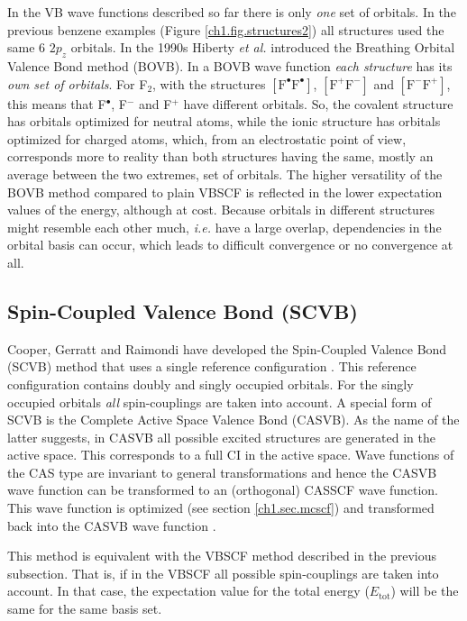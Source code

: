 In the VB wave functions described so far there is only \textit{one} set of orbitals. In the previous benzene examples (Figure \ref{ch1.fig.structures2}) all structures used the same 6 $2p_z$ orbitals. In the 1990s Hiberty \textit{et al.} introduced the Breathing Orbital Valence Bond method (BOVB). In a BOVB wave function \textit{each structure} has its \textit{own set of orbitals}. For F$_2$, with the structures $\mathrm{[F^\bullet F^\bullet]}$, $\mathrm{[F^{+} F^{-}]}$ and $\mathrm{[F^{-} F^{+}]}$, this means that F$^\bullet$, F$^{-}$ and F$^{+}$ have different orbitals. So, the covalent structure has orbitals optimized for neutral atoms, while the ionic structure has orbitals optimized for charged atoms, which, from an electrostatic point of view, corresponds more to reality than both structures having the same, mostly an average between the two extremes, set of orbitals. The higher versatility of the BOVB method compared to plain VBSCF is reflected in the lower expectation values of the energy, although at cost. Because orbitals in different structures might resemble each other much, \textit{i.e.} have a large overlap, dependencies in the orbital basis can occur, which leads to difficult convergence or no convergence at all.

\subsection{Spin-Coupled Valence Bond (SCVB)}
Cooper, Gerratt and Raimondi have developed the Spin-Coupled Valence Bond (SCVB) method that uses a single reference configuration \cite{scvb1,scvb2,scvb3}. This reference configuration contains doubly and singly occupied orbitals. For the singly occupied orbitals \textit{all} spin-couplings are taken into account. A special form of SCVB is the Complete Active Space Valence Bond (CASVB). As the name of the latter suggests, in CASVB all possible excited structures are generated in the active space. This corresponds to a full CI in the active space. Wave functions of the CAS type are invariant to general transformations and hence the CASVB wave function can be transformed to an (orthogonal) CASSCF wave function. This wave function is optimized (see section \ref{ch1.sec.mcscf}) and transformed back into the CASVB wave function \cite{thor1,thor2,thor3,thor4}.

This method is equivalent with the VBSCF method described in the previous subsection. That is, if in the VBSCF all possible spin-couplings are taken into account. In that case, the expectation value for the total energy ($E_\mathrm{tot}$) will be the same for the same basis set.

